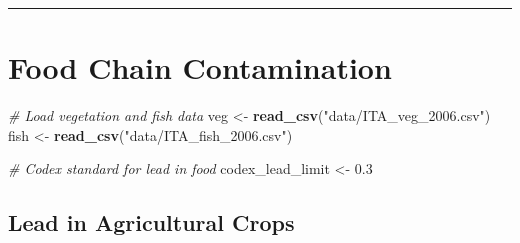 \documentclass[
]{article}
\newenvironment{Shaded}{\begin{snugshade}}{\end{snugshade}}
\newcommand{\CommentTok}[1]{\textcolor[rgb]{0.56,0.35,0.01}{\textit{#1}}}
\newcommand{\FloatTok}[1]{\textcolor[rgb]{0.00,0.00,0.81}{#1}}
\newcommand{\FunctionTok}[1]{\textcolor[rgb]{0.13,0.29,0.53}{\textbf{#1}}}
\newcommand{\NormalTok}[1]{#1}
\newcommand{\OtherTok}[1]{\textcolor[rgb]{0.56,0.35,0.01}{#1}}
\newcommand{\StringTok}[1]{\textcolor[rgb]{0.31,0.60,0.02}{#1}}
\begin{document}
\begin{center}\rule{0.5\linewidth}{0.5pt}\end{center}

\section{Food Chain Contamination}\label{food-chain-contamination}

\begin{Shaded}
\begin{Highlighting}[]
\CommentTok{\# Load vegetation and fish data}
\NormalTok{veg }\OtherTok{\textless{}{-}} \FunctionTok{read\_csv}\NormalTok{(}\StringTok{"data/ITA\_veg\_2006.csv"}\NormalTok{)}
\NormalTok{fish }\OtherTok{\textless{}{-}} \FunctionTok{read\_csv}\NormalTok{(}\StringTok{"data/ITA\_fish\_2006.csv"}\NormalTok{)}

\CommentTok{\# Codex standard for lead in food}
\NormalTok{codex\_lead\_limit }\OtherTok{\textless{}{-}} \FloatTok{0.3}
\end{Highlighting}
\end{Shaded}

\subsection{Lead in Agricultural
Crops}\label{lead-in-agricultural-crops}
\end{document}
